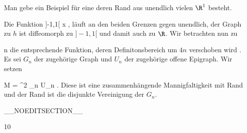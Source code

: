 {

Man gebe ein Beispiel für eine
deren Rand aus
 {} {}
unendlich vielen  $\R^1$ besteht.

}
{

Die Funktion
 {]-1,1[ } { \R
} { x } { {  }
} {,}
läuft an den beiden Grenzen gegen unendlich, der Graph zu $h$ ist diffeomorph zu $]-1,1[$ und damit auch zu $\R$. Wir betrachten nun zu

\mavergleichskette
{\vergleichskette
{ n
}
{ \in }{  \Z
}
{  }{
}
{    }{
}
{   }{
}
}
{}{}{}
die entsprechende Funktion, deren Definitonsbereich um $4n$ verschoben wird
\zusatzklammer {also mit dem Definitionsbereich
\mathl{]4n-1,4n+1[}{}} {} {.}
Es sei $G_n$ der zugehörige Graph und $U_n$ der zugehörige offene
\zusatzklammer {!} {} {}
Epigraph. Wir setzen

\mavergleichskettedisp
{\vergleichskette
{ M
}
{ =} { \R^2 \setminus \biguplus_{n \in \Z} U_n
}
{ } {
}
{ } {
}
{ } {
}
}
{}{}{.}
Diese ist eine zusammenhängende Mannigfaltigkeit mit Rand und der Rand ist die disjunkte Vereinigung der $G_n$.

 }

__NOEDITSECTION__

{10}

